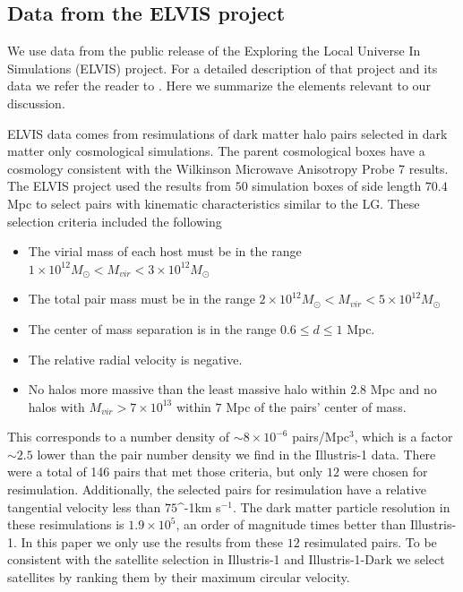 \documentclass[a4paper,fleqn,usenatbib]{mnras}
\newcommand{\kms}{\ifmmode\mathrm{km\ s}^{-1}\else km s$^{-1}$\fi}
\begin{document}
\subsection{Data from the ELVIS project}
\label{sim:ELVIS}

We use data from the public release of the Exploring the Local
Universe In Simulations (ELVIS) project.
For a detailed description of that project and its data we refer the
reader to \cite{2014MNRAS.438.2578G}. 
Here we summarize the elements relevant to our discussion.

ELVIS data comes from resimulations of dark matter halo pairs selected
in dark matter only cosmological simulations. 
The parent cosmological boxes have a cosmology consistent with the
Wilkinson Microwave Anisotropy Probe 7 results.
The ELVIS project used the results from $50$ simulation boxes of side
length $70.4$ Mpc to select pairs with kinematic characteristics
similar to the LG. 
These selection criteria included the following
\begin{itemize}
\item The virial mass of each host must be in the range 
$1\times
  10^{12} M_{\odot}< M_{vir}<3\times 10^{12}M_{\odot}$ 
\item The total pair mass must be in the range
$2\times
  10^{12} M_{\odot}< M_{vir}<5\times 10^{12}M_{\odot}$ 
\item The center of mass separation is in the range $0.6\leq d\leq1$
  Mpc.
\item The relative radial velocity is negative.
\item No halos more massive than the least massive halo within $2.8$
  Mpc and no halos with $M_{vir}>7\times 10^{13}$ within $7$ Mpc of
  the pairs' center of mass.
\end{itemize} 

This corresponds to a number density of $\sim 8 \times10^{-6}$
pairs/Mpc$^{3}$, which is a factor $\sim 2.5$ lower than the pair
number density we find in the Illustris-1 data.
There were a total of 146 pairs that met those criteria, but only $12$
were chosen for resimulation. 
Additionally, the selected pairs for resimulation have a relative
tangential velocity less than $75 $\kms. 
The dark matter particle resolution in these resimulations is
$1.9\times 10^5$, an order of magnitude times better than Illustris-1.
In this paper we only use the results from these $12$ resimulated pairs.
To be consistent with the satellite selection in Illustris-1 and
Illustris-1-Dark we select satellites by ranking them by their
maximum circular velocity.
\end{document}
